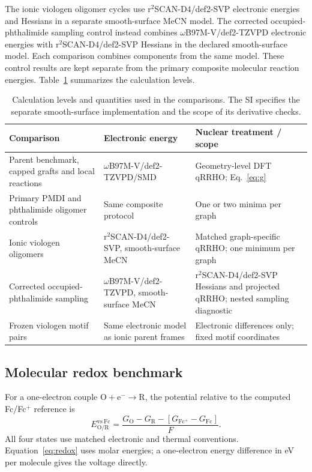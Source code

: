 \documentclass[11pt]{article}
\begin{document}
The ionic viologen oligomer cycles use r$^2$SCAN-D4/def2-SVP electronic energies and Hessians in a separate smooth-surface MeCN model. The corrected occupied-phthalimide sampling control instead combines $\omega$B97M-V/def2-TZVPD electronic energies with r$^2$SCAN-D4/def2-SVP Hessians in the declared smooth-surface model. Each comparison combines components from the same model. These control results are kept separate from the primary composite molecular reaction energies. Table~\ref{tab:levels} summarizes the calculation levels.
\begin{table}[htbp]\centering\small
\caption{Calculation levels and quantities used in the comparisons. The SI specifies the separate smooth-surface implementation and the scope of its derivative checks.}
\label{tab:levels}
\begin{tabular}{p{.25\linewidth}p{.36\linewidth}p{.29\linewidth}}\toprule
Comparison & Electronic energy & Nuclear treatment / scope\\\midrule
Parent benchmark, capped grafts and local reactions & $\omega$B97M-V/def2-TZVPD/SMD & Geometry-level DFT qRRHO; Eq.~\ref{eq:g}\\
Primary PMDI and phthalimide oligomer controls & Same composite protocol & One or two minima per graph\\
Ionic viologen oligomers & r$^2$SCAN-D4/def2-SVP, smooth-surface MeCN & Matched graph-specific qRRHO; one minimum per graph\\
Corrected occupied-phthalimide sampling & $\omega$B97M-V/def2-TZVPD, smooth-surface MeCN & r$^2$SCAN-D4/def2-SVP Hessians and projected qRRHO; nested sampling diagnostic\\
Frozen viologen motif pairs & Same electronic model as ionic parent frames & Electronic differences only; fixed motif coordinates\\\bottomrule
\end{tabular}\end{table}

\subsection{Molecular redox benchmark}
For a one-electron couple $\mathrm{O+e^-\rightarrow R}$, the potential relative to the computed Fc/Fc$^+$ reference is
\begin{equation}
E_{\mathrm{O/R}}^{\mathrm{vs\ Fc}}=
\frac{G_{\mathrm O}-G_{\mathrm R}-[G_{\mathrm{Fc^+}}-G_{\mathrm{Fc}}]}{F}.
\label{eq:redox}
\end{equation}
All four states use matched electronic and thermal conventions. Equation~\ref{eq:redox} uses molar energies; a one-electron energy difference in eV per molecule gives the voltage directly.
\end{document}
